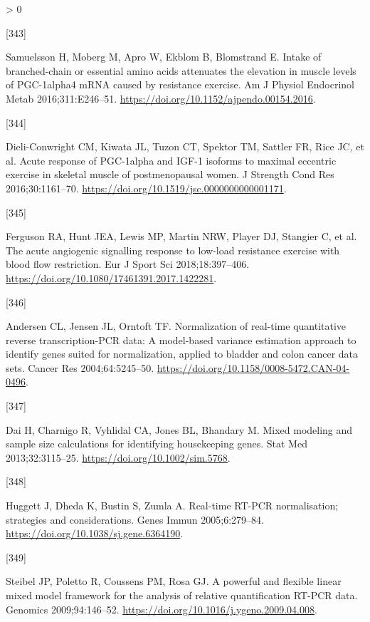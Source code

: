 \documentclass[twoside,10pt]{gihclass} %
\newlength{\cslhangindent}
\newlength{\csllabelwidth}
\newenvironment{CSLReferences}[3] %
 {%
  \setlength{\parindent}{0pt}
  \ifodd #1 \everypar{\setlength{\hangindent}{\cslhangindent}}\ignorespaces\fi
  \ifnum #2 > 0
  \setlength{\parskip}{#2\baselineskip}
  \fi
 }%
 {}
\newcommand{\CSLLeftMargin}[1]{\parbox[t]{\maxof{\widthof{#1}}{\csllabelwidth}}{#1}}
\newcommand{\CSLRightInline}[1]{\parbox[t]{\linewidth}{#1}}
\begin{document}
\begin{CSLReferences}{0}{0}
\leavevmode\hypertarget{ref-RN2084}{}%
\CSLLeftMargin{{[}343{]} }
\CSLRightInline{Samuelsson H, Moberg M, Apro W, Ekblom B, Blomstrand E. Intake of branched-chain or essential amino acids attenuates the elevation in muscle levels of PGC-1alpha4 mRNA caused by resistance exercise. Am J Physiol Endocrinol Metab 2016;311:E246--51. \url{https://doi.org/10.1152/ajpendo.00154.2016}.}

\leavevmode\hypertarget{ref-RN2086}{}%
\CSLLeftMargin{{[}344{]} }
\CSLRightInline{Dieli-Conwright CM, Kiwata JL, Tuzon CT, Spektor TM, Sattler FR, Rice JC, et al. Acute response of PGC-1alpha and IGF-1 isoforms to maximal eccentric exercise in skeletal muscle of postmenopausal women. J Strength Cond Res 2016;30:1161--70. \url{https://doi.org/10.1519/jsc.0000000000001171}.}

\leavevmode\hypertarget{ref-RN2087}{}%
\CSLLeftMargin{{[}345{]} }
\CSLRightInline{Ferguson RA, Hunt JEA, Lewis MP, Martin NRW, Player DJ, Stangier C, et al. The acute angiogenic signalling response to low-load resistance exercise with blood flow restriction. Eur J Sport Sci 2018;18:397--406. \url{https://doi.org/10.1080/17461391.2017.1422281}.}

\leavevmode\hypertarget{ref-RN1772}{}%
\CSLLeftMargin{{[}346{]} }
\CSLRightInline{Andersen CL, Jensen JL, Orntoft TF. Normalization of real-time quantitative reverse transcription-PCR data: A model-based variance estimation approach to identify genes suited for normalization, applied to bladder and colon cancer data sets. Cancer Res 2004;64:5245--50. \url{https://doi.org/10.1158/0008-5472.CAN-04-0496}.}

\leavevmode\hypertarget{ref-RN1771}{}%
\CSLLeftMargin{{[}347{]} }
\CSLRightInline{Dai H, Charnigo R, Vyhlidal CA, Jones BL, Bhandary M. Mixed modeling and sample size calculations for identifying housekeeping genes. Stat Med 2013;32:3115--25. \url{https://doi.org/10.1002/sim.5768}.}

\leavevmode\hypertarget{ref-RN1984}{}%
\CSLLeftMargin{{[}348{]} }
\CSLRightInline{Huggett J, Dheda K, Bustin S, Zumla A. Real-time RT-PCR normalisation; strategies and considerations. Genes Immun 2005;6:279--84. \url{https://doi.org/10.1038/sj.gene.6364190}.}

\leavevmode\hypertarget{ref-RN1154}{}%
\CSLLeftMargin{{[}349{]} }
\CSLRightInline{Steibel JP, Poletto R, Coussens PM, Rosa GJ. A powerful and flexible linear mixed model framework for the analysis of relative quantification RT-PCR data. Genomics 2009;94:146--52. \url{https://doi.org/10.1016/j.ygeno.2009.04.008}.}


\end{CSLReferences}
\end{document}
